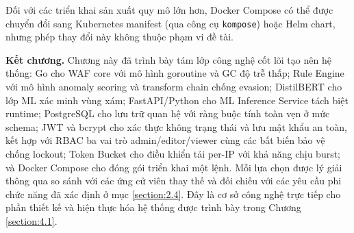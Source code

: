 \documentclass[../DoAn.tex]{subfiles}
\begin{document}
Đối với các triển khai sản xuất quy mô lớn hơn, Docker Compose có thể được
chuyển đổi sang Kubernetes manifest (qua công cụ \texttt{kompose}) hoặc
Helm chart, nhưng phép thay đổi này không thuộc phạm vi đề tài.

\bigskip
\noindent\textbf{Kết chương.}
Chương này đã trình bày tám lớp công nghệ cốt lõi tạo nên hệ thống: Go cho
WAF core với mô hình goroutine và GC độ trễ thấp; Rule Engine với mô hình
anomaly scoring và transform chain chống evasion; DistilBERT cho lớp ML
xác minh vùng xám; FastAPI/Python cho ML Inference Service tách biệt
runtime; PostgreSQL cho lưu trữ quan hệ với ràng buộc tính toàn vẹn ở mức
schema; JWT và bcrypt cho xác thực không trạng thái và lưu mật khẩu an
toàn, kết hợp với RBAC ba vai trò admin/editor/viewer cùng các bất biến
bảo vệ chống lockout; Token Bucket cho điều khiển tải per-IP với khả năng
chịu burst; và Docker Compose cho đóng gói triển khai một lệnh. Mỗi lựa
chọn được lý giải thông qua so sánh với các ứng cử viên thay thế và đối
chiếu với các yêu cầu phi chức năng đã xác định ở mục \ref{section:2.4}.
Đây là cơ sở công nghệ trực tiếp cho phần thiết kế và hiện thực hóa hệ
thống được trình bày trong Chương \ref{section:4.1}.
\end{document}
